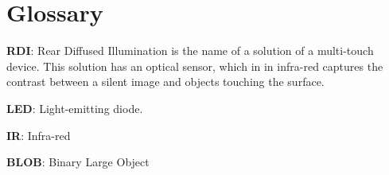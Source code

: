 \chapter{Glossary}\label{gloss}

\textbf{RDI}: Rear Diffused Illumination is the name of a solution of a multi-touch device\citep{multiTT}. This solution has an optical sensor, which in in infra-red captures the contrast between a silent image and objects touching the surface.

\textbf{LED}: Light-emitting diode.

\textbf{IR}: Infra-red

\textbf{BLOB}: Binary Large Object 
